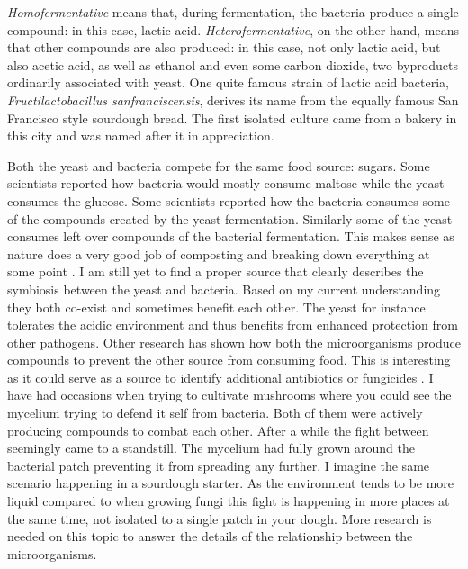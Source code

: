 \emph{Homofermentative} means that, during fermentation, the bacteria produce
a single compound: in this case, lactic acid. \emph{Heterofermentative}, on
the other hand, means that other compounds are also produced: in this case,
not only lactic acid, but also acetic acid, as well as ethanol and even some
carbon dioxide, two byproducts ordinarily associated with yeast. One quite
famous strain of lactic acid bacteria, \emph{Fructilactobacillus sanfranciscensis},
derives its name from the equally famous San Francisco style sourdough bread.
The first isolated culture came from a bakery in this city and was named after
it in appreciation.

Both the yeast and bacteria compete for the same food source: sugars.
Some scientists reported how bacteria would mostly consume maltose
while the yeast consumes the glucose. Some scientists reported
how the bacteria consumes some of the compounds created by the
yeast fermentation. Similarly some of the yeast consumes left
over compounds of the bacterial fermentation. This makes sense
as nature does a very good job of composting and breaking down
everything at some point \cite{lactobacillus+sanfrancisco}.
I am still yet to find
a proper source that clearly describes the symbiosis between
the yeast and bacteria. Based on my current understanding
they both co-exist and sometimes benefit each other. The yeast
for instance tolerates the acidic environment and thus benefits
from enhanced protection from other pathogens. Other research
has shown how both the microorganisms produce compounds
to prevent the other source from consuming food. This is interesting
as it could serve as a source to identify additional antibiotics
or fungicides \cite{mold+lactic+acid+bacteria}. I have had
occasions when trying to cultivate mushrooms where you could
see the mycelium trying to defend it self from bacteria. Both
of them were actively producing compounds to combat each other.
After a while the fight between seemingly came to a standstill.
The mycelium had fully grown around the bacterial patch preventing
it from spreading any further. I imagine the same scenario happening
in a sourdough starter. As the environment tends to be more liquid
compared to when growing fungi this fight is happening in more places
at the same time, not isolated to a single patch in your dough.
More research is needed on this topic to answer the details of the
relationship between the microorganisms.

